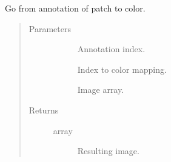 \documentclass[letterpaper,10pt,english]{sphinxmanual}
\begin{document}

\begin{fulllineitems}
\label{\detokenize{index:pathflowai.visualize.annotation2rgb}}
Go from annotation of patch to color.
\begin{quote}\begin{description}
\item[{Parameters}] \leavevmode\begin{description}
\item[{}] \leavevmode
Annotation index.

\item[{}] \leavevmode
Index to color mapping.

\item[{}] \leavevmode
Image array.

\end{description}

\item[{Returns}] \leavevmode\begin{description}
\item[{array}] \leavevmode
Resulting image.

\end{description}

\end{description}\end{quote}

\end{fulllineitems}

\end{document}
